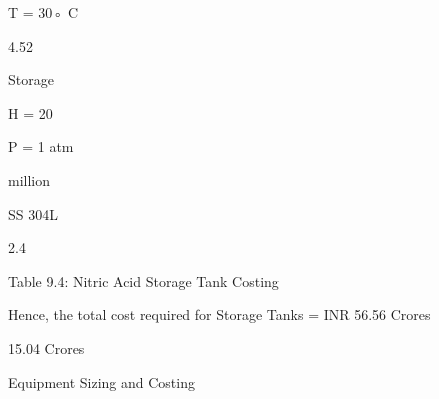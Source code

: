 \documentclass[a4paper,portrait,12pt]{article}
\begin{document}
\begin{flushleft}
T = 30◦ C
\end{flushleft}





4.52





\begin{flushleft}
Storage
\end{flushleft}





\begin{flushleft}
H = 20
\end{flushleft}





\begin{flushleft}
P = 1 atm
\end{flushleft}





\begin{flushleft}
million
\end{flushleft}





\begin{flushleft}
SS 304L
\end{flushleft}





2.4





\begin{flushleft}
Table 9.4: Nitric Acid Storage Tank Costing
\end{flushleft}





\begin{flushleft}
Hence, the total cost required for Storage Tanks = INR 56.56 Crores
\end{flushleft}





\begin{flushleft}
15.04 Crores
\end{flushleft}





\begin{flushleft}
\newpage
Equipment Sizing and Costing
\end{flushleft}
\end{document}
